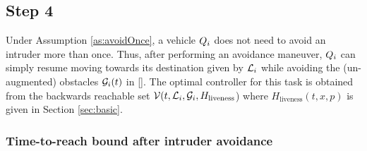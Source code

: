\subsection{Step 4}
Under Assumption \ref{as:avoidOnce}, a vehicle $Q_{i}$ does not need to avoid an intruder more than once. Thus, after performing an avoidance maneuver, $Q_{i}$ can simply resume moving towards its destination given by $\mathcal{L}_i$ while avoiding the (un-augmented) obstacles $\mathcal{G}_i(t)$ in \eqref{}. The optimal controller for this task is obtained from the backwards reachable set $\mathcal{V}(t, \mathcal{L}_i, \mathcal{G}_i, H_\text{liveness}$) where $H_\text{liveness}(t, x, p)$ is given in Section \ref{sec:basic}.

\subsubsection{Time-to-reach bound after intruder avoidance}
